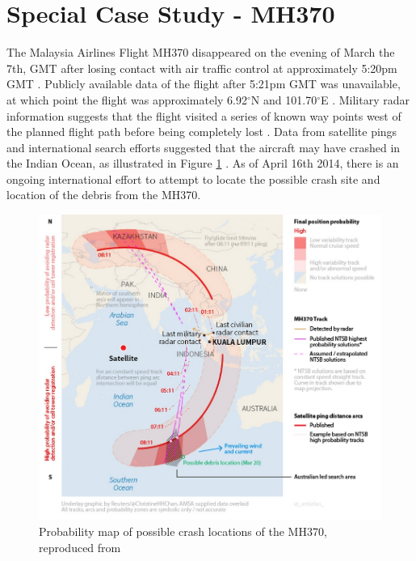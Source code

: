 \section{Special Case Study - MH370}\label{sec:mh370}
The Malaysia Airlines Flight MH370 disappeared on the evening of March the 7th, GMT after losing contact with air traffic control at approximately 5:20pm GMT \cite{Rahman2014}. Publicly available data of the flight after 5:21pm GMT was unavailable, at which point the flight was approximately 6.92$^\circ$N and 101.70$^\circ$E \cite{FlightRadar}. Military radar information suggests that the flight visited a series of known way points west of the planned flight path before being completely lost \cite{ReutersRadar}. Data from satellite pings and international search efforts suggested that the aircraft may have crashed in the Indian Ocean, as illustrated in Figure \ref{fig:mh370_probability_map} \cite{PaulColg, Pandey, ABCNews2014}. As of April 16th 2014, there is an ongoing international effort to attempt to locate the possible crash site and location of the debris from the MH370. 
\begin{figure}[H]
	\centering
	\includegraphics[scale = 0.5]{Pictures/mh370_probability_map.jpg}
	
	\caption[Probability map of possible crash locations of the MH370]{Probability map of possible crash locations of the MH370, reproduced from \cite{PaulColg}}
	\label{fig:mh370_probability_map}
\end{figure}
